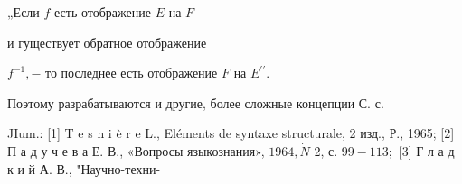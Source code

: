 \documentclass[10pt]{article}
\begin{document}
„Если $f$ есть отображение $E$ на $F$



и гуществует обратное отображение



$f^{-1},-$ то последнее есть отображение $F$ на $E^{\prime \prime}$.



Поэтому разрабатываются и другие, более сложные концепции С. с.



JIum.: [1] T e s n i è r e L., Eléments de syntaxe structurale, 2 изд., Р., 1965; [2] П а д у ч е в а Е. В., «Вопросы языкознания», $1964, \dot{N}$ 2, с. $99-113 ;$ [3] Г л а д к и й А. В., "Научно-техни-
\end{document}
